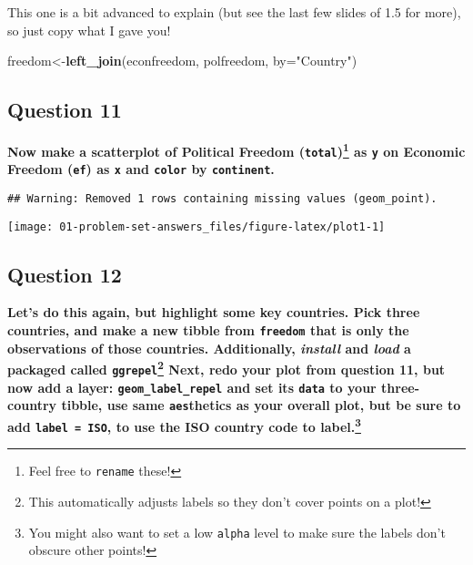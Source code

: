 \documentclass[
]{article}
\newenvironment{Shaded}{\begin{snugshade}}{\end{snugshade}}
\newcommand{\DataTypeTok}[1]{\textcolor[rgb]{0.13,0.29,0.53}{#1}}
\newcommand{\KeywordTok}[1]{\textcolor[rgb]{0.13,0.29,0.53}{\textbf{#1}}}
\newcommand{\NormalTok}[1]{#1}
\newcommand{\StringTok}[1]{\textcolor[rgb]{0.31,0.60,0.02}{#1}}
\begin{document}
This one is a bit advanced to explain (but see the last few slides of
1.5 for more), so just copy what I gave you!

\begin{Shaded}
\begin{Highlighting}[]
\NormalTok{freedom<-}\KeywordTok{left_join}\NormalTok{(econfreedom, polfreedom, }\DataTypeTok{by=}\StringTok{"Country"}\NormalTok{)}
\end{Highlighting}
\end{Shaded}

\hypertarget{question-11}{%
\subsection{Question 11}\label{question-11}}

\textbf{Now make a scatterplot of Political Freedom
(\texttt{total})\footnote{Feel free to \texttt{rename} these!} as
\texttt{y} on Economic Freedom (\texttt{ef}) as \texttt{x} and
\texttt{color} by \texttt{continent}.}

\begin{verbatim}
## Warning: Removed 1 rows containing missing values (geom_point).
\end{verbatim}

\texttt{[image: 01-problem-set-answers\_files/figure-latex/plot1-1]}

\hypertarget{question-12}{%
\subsection{Question 12}\label{question-12}}

\textbf{Let's do this again, but highlight some key countries. Pick
three countries, and make a new tibble from \texttt{freedom} that is
only the observations of those countries. Additionally, \emph{install}
and \emph{load} a packaged called \texttt{ggrepel}\footnote{This
  automatically adjusts labels so they don't cover points on a plot!}
Next, redo your plot from question 11, but now add a layer:
\texttt{geom\_label\_repel} and set its \texttt{data} to your
three-country tibble, use same \texttt{aes}thetics as your overall plot,
but be sure to add \texttt{label\ =\ ISO}, to use the ISO country code
to label.\footnote{You might also want to set a low \texttt{alpha} level
  to make sure the labels don't obscure other points!}}
\end{document}
